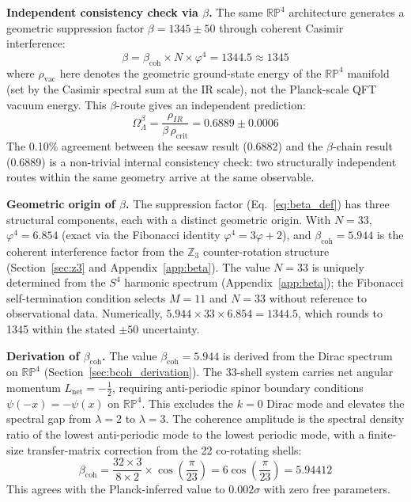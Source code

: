 \documentclass[12pt,a4paper]{article}
\begin{document}
\textbf{Independent consistency check via $\beta$.}
The same $\mathbb{RP}^4$ architecture generates a geometric suppression factor
$\beta = 1345 \pm 50$ through coherent Casimir interference:
\begin{equation}
  \beta = \beta_\mathrm{coh} \times N \times \varphi^4 = 1344.5 \approx 1345
  \label{eq:beta_def}
\end{equation}
where $\rho_\mathrm{vac}$ here denotes the geometric ground-state energy of the
$\mathbb{RP}^4$ manifold (set by the Casimir spectral sum at the IR scale), not the
Planck-scale QFT vacuum energy. This $\beta$-route gives an independent prediction:
\begin{equation}
  \Omega_\Lambda^\beta = \frac{\rho_{IR}}{\beta\,\rho_\mathrm{crit}}
  = 0.6889 \pm 0.0006
  \label{eq:OmL_beta}
\end{equation}
The 0.10\% agreement between the seesaw result (0.6882) and the $\beta$-chain result
(0.6889) is a non-trivial internal consistency check: two structurally independent
routes within the same geometry arrive at the same observable.

\textbf{Geometric origin of $\beta$.} The suppression factor (Eq.~\ref{eq:beta_def}) has three structural
components, each with a distinct geometric origin.
With $N = 33$, $\varphi^4 = 6.854$ (exact via the Fibonacci
identity $\varphi^4 = 3\varphi + 2$), and $\beta_\mathrm{coh} = 5.944$ is the
coherent interference factor from the $\mathbb{Z}_3$ counter-rotation structure
(Section~\ref{sec:z3} and Appendix~\ref{app:beta}). The value $N = 33$ is
uniquely determined from the $S^4$ harmonic spectrum (Appendix~\ref{app:beta});
the Fibonacci self-termination condition selects $M = 11$ and $N = 33$ without
reference to observational data. Numerically,
$5.944 \times 33 \times 6.854 = 1344.5$, which rounds to 1345 within the stated
$\pm 50$ uncertainty.

\textbf{Derivation of $\beta_\mathrm{coh}$.} The value $\beta_\mathrm{coh} = 5.944$ is
derived from the Dirac spectrum on $\mathbb{RP}^4$ (Section~\ref{sec:bcoh_derivation}).
The 33-shell system carries net angular momentum $L_\mathrm{net} = -\tfrac{1}{2}$,
requiring anti-periodic spinor boundary conditions $\psi(-x) = -\psi(x)$ on
$\mathbb{RP}^4$. This excludes the $k=0$ Dirac mode and elevates the spectral gap from
$\lambda=2$ to $\lambda=3$. The coherence amplitude is the spectral density ratio of the
lowest anti-periodic mode to the lowest periodic mode, with a finite-size transfer-matrix correction from the 22 co-rotating shells:
\begin{equation}
  \beta_\mathrm{coh} = \frac{32 \times 3}{8 \times 2} \times \cos\!\left(\frac{\pi}{23}\right)
  = 6\cos\!\left(\frac{\pi}{23}\right) = 5.94412
\end{equation}
This agrees with the Planck-inferred value to $0.002\sigma$ with zero free parameters.
\end{document}
